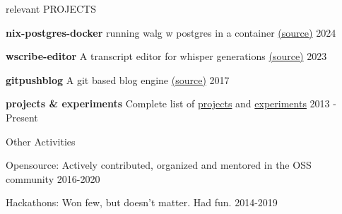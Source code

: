 \documentclass{resume} %
\begin{document}

\begin{rSection}{relevant PROJECTS}
  \vspace{-1.25em}
  \item \textbf{nix-postgres-docker} {running walg w postgres in a container \href{https://github.com/geekodour/nix-postgres-docker}{(source)}} \hfill 2024
  \item \textbf{wscribe-editor} {A transcript editor for whisper generations \href{https://github.com/geekodour/wscribe-editor}{(source)}} \hfill 2023
  \item \textbf{gitpushblog} {A git based blog engine \href{https://github.com/geekodour/gitpushblog}{(source)}} \hfill 2017
  \item \textbf{projects \& experiments} {Complete list of \href{https://geekodour.org/docs/updates/projects/}{projects} and
 \href{https://geekodour.org/docs/updates/experiments/}{experiments}
  } \hfill 2013 - Present
\end{rSection}

\begin{rSection}{Other Activities}
  \vspace{-1.25em}
    \item Opensource: Actively contributed, organized and mentored in the OSS community \hfill 2016-2020
    \item Hackathons: Won few, but doesn't matter. Had fun. \hfill 2014-2019
\end{rSection}




\end{document}
